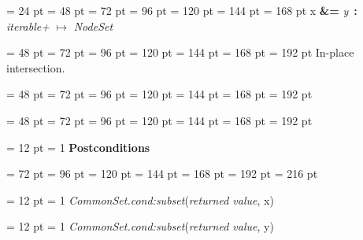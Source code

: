 {{{{{\par}
\par}
\par}
\par}
{\par \noindent  \leftskip = 24 pt  \leftmargini = 48 pt  \leftmarginii = 72 pt  \leftmarginiii = 96 pt  \leftmarginiv = 120 pt  \leftmarginv = 144 pt  \leftmarginvi = 168 pt x {\large {\bf {\&}=\/}} {\em y\/}~{\bf :}  {\em iterable+\/} \(\mapsto \)  {\em NodeSet\/}{\par \noindent
{\par \noindent  \leftskip = 48 pt  \leftmargini = 72 pt  \leftmarginii = 96 pt  \leftmarginiii = 120 pt  \leftmarginiv = 144 pt  \leftmarginv = 168 pt  \leftmarginvi = 192 pt 
In-place intersection.\par}
{\par \noindent  \leftskip = 48 pt  \leftmargini = 72 pt  \leftmarginii = 96 pt  \leftmarginiii = 120 pt  \leftmarginiv = 144 pt  \leftmarginv = 168 pt  \leftmarginvi = 192 pt {\par \noindent
\par}
\par}
{\par \noindent  \leftskip = 48 pt  \leftmargini = 72 pt  \leftmarginii = 96 pt  \leftmarginiii = 120 pt  \leftmarginiv = 144 pt  \leftmarginv = 168 pt  \leftmarginvi = 192 pt {\par \noindent
{\par \pagebreak[3.100000] \noindent \hangindent = 12 pt \hangafter = 1 
{\bf Postconditions\/}\par}
{\par \noindent  \leftskip = 72 pt  \leftmargini = 96 pt  \leftmarginii = 120 pt  \leftmarginiii = 144 pt  \leftmarginiv = 168 pt  \leftmarginv = 192 pt  \leftmarginvi = 216 pt {\par \noindent
{\par \pagebreak[3.000000] \noindent \hangindent = 12 pt \hangafter = 1 
 {\em CommonSet.cond:subset\/}({\em returned value\/}, x)\par}
{\par \pagebreak[3.000000] \noindent \hangindent = 12 pt \hangafter = 1 
 {\em CommonSet.cond:subset\/}({\em returned value\/}, y)\par}
\par}
\par}
\par}
\par}
\par}
\par}
}
